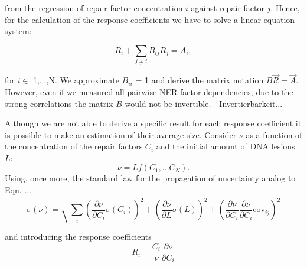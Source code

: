 from the regression of repair factor concentration $i$ against repair factor $j$. Hence, for the calculation of the response coefficients we have to solve a linear equation system:

\begin{equation}
	R_i + \sum_{j\neq i} B_{ij}R_j = A_i,
\end{equation}

for $i \in$ 1,...,N. We approximate $B_{ii}$ = 1 and derive the matrix notation $B\vec{R}=\vec{A}$. However, even if we measured all pairwise NER factor dependencies, due to the strong correlations the matrix $B$ would not be invertible.
- Invertierbarkeit...

Although we are not able to derive a specific result for each response coefficient it is possible to make an estimation of their average size. Consider $\nu$ as a function of the concentration of the repair factors $C_i$ and the initial amount of DNA lesions $L$:
\begin{equation}
	\nu = Lf(C_1,...C_N).
\end{equation}
Using, once more, the standard law for the propagation of uncertainty analog to Eqn. ...
 \begin{equation}
 \sigma(\nu) = \sqrt{\sum_{i}\left(\frac{\partial \nu}{\partial C_i}\sigma(C_i) \right)^2 + \left(\frac{\partial \nu}{\partial L}\sigma(L)\right)^2 + \left(\frac{\partial \nu}{\partial C_i} \frac{\partial \nu}{\partial C_i}\textrm{cov}_{ij}\right)^2}
 \end{equation}  
 
 and introducing the response coefficients 
 \begin{equation}
 R_i = \frac{C_i}{\nu}\frac{\partial \nu}{\partial C_i} \nonumber
 \end{equation}
